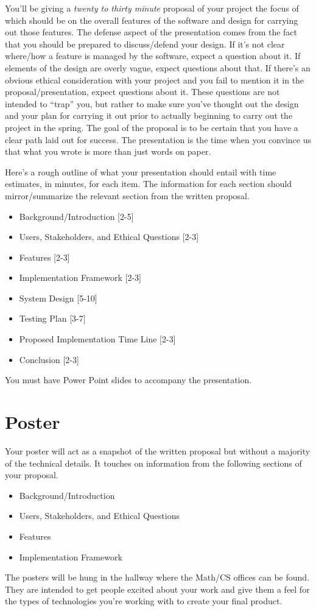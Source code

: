\documentclass[10pt]{article}
\begin{document}
You'll be giving a \textit{twenty to thirty minute} proposal of your project the focus of which should be on the overall features of the software and design for carrying out those features. The defense aspect of the presentation comes from the fact that you should be prepared to discuss/defend your design.  If it's not clear where/how a feature is managed by the software, expect a question about it.  If elements of the design are overly vague, expect questions about that.  If there's an obvious ethical consideration with your project and you fail to mention it in the proposal/presentation, expect questions about it.  These questions are not intended to ``trap'' you, but rather to make sure you've thought out the design and your plan for carrying it out prior to actually beginning to carry out the project in the spring.  The goal of the proposal is to be certain that you have a clear path laid out for success.  The presentation is the time when you convince us that what you wrote is more than just words on paper.  

Here's a rough outline of what your presentation should entail with time estimates, in minutes, for each item.  The information for each section should mirror/summarize the relevant section from the written proposal. 
\begin{itemize}
\item Background/Introduction [2-5]
\item Users, Stakeholders, and Ethical Questions [2-3]
\item Features [2-3]
\item Implementation Framework [2-3]
\item System Design [5-10]
\item Testing Plan [3-7]
\item Proposed Implementation Time Line [2-3]
\item Conclusion [2-3]
\end{itemize}
You must have Power Point slides to accompany the presentation.

\section{Poster}

Your poster will act as a snapshot of the written proposal but without a majority of the technical details.  It touches on information from the following sections of your proposal.
\begin{itemize}
\item Background/Introduction
\item Users, Stakeholders, and Ethical Questions
\item Features
\item Implementation Framework
\end{itemize}
The posters will be hung in the hallway where the Math/CS offices can be found.  They are intended to get people excited about your work and give them a feel for the types of technologies you're working with to create your final product.    
\end{document}
